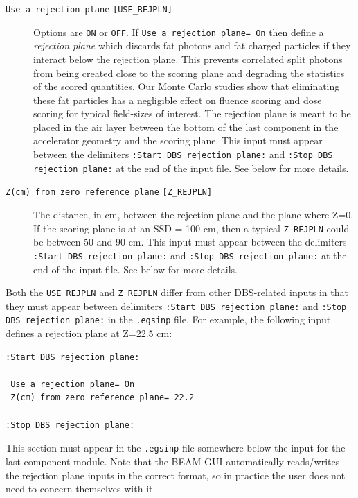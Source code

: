 \documentclass[12pt,twoside]{article}
\begin{document}
\begin{description}
\item[{\tt Use a rejection plane} {\tt [USE\_REJPLN]}] Options are {\tt ON} or
{\tt OFF}. If {\tt Use a rejection plane= On} then define
a {\em rejection plane} which discards fat photons and
fat charged particles if they interact below the rejection plane. This
prevents correlated split photons from being created close to the
scoring plane and degrading the statistics of the scored
quantities. Our Monte Carlo studies show that eliminating these fat
particles has a negligible effect on fluence scoring\cite{AR07} and
dose scoring\cite{Ka04a} for typical field-sizes of interest. The
rejection plane is meant to be placed in the air layer between the
bottom of the last component in the accelerator geometry and the
scoring plane.  This input
must appear between the delimiters
{\tt :Start DBS rejection plane:} and
{\tt :Stop DBS rejection plane:} at the end of the input file.
See below for more details.


\item[{\tt Z(cm) from zero reference plane} {\tt [Z\_REJPLN]}]
The distance, in cm, between the rejection
plane and the plane where Z=0. If the scoring plane
is at an SSD = 100 cm, then a typical {\tt Z\_REJPLN} could be between
50 and 90 cm.
This input must appear between the delimiters
{\tt :Start DBS rejection plane:} and
{\tt :Stop DBS rejection plane:} at the end of the input file.
See below for more details.

\end{description}

Both the {\tt USE\_REJPLN} and {\tt Z\_REJPLN} differ from other
DBS-related inputs in that they must appear between
delimiters {\tt :Start DBS rejection plane:} and
{\tt :Stop DBS rejection plane:} in the
{\tt .egsinp} file.  For example, the following input
defines a rejection plane at Z=22.5 cm:
\begin{verbatim}
:Start DBS rejection plane:

 Use a rejection plane= On
 Z(cm) from zero reference plane= 22.2

:Stop DBS rejection plane:
\end{verbatim}
This section must appear in the {\tt .egsinp} file somewhere below the input
for the last component module.  Note that the
BEAM GUI automatically reads/writes the rejection plane
inputs in the correct format, so in practice the user does
not need to concern themselves with it.
\end{document}
